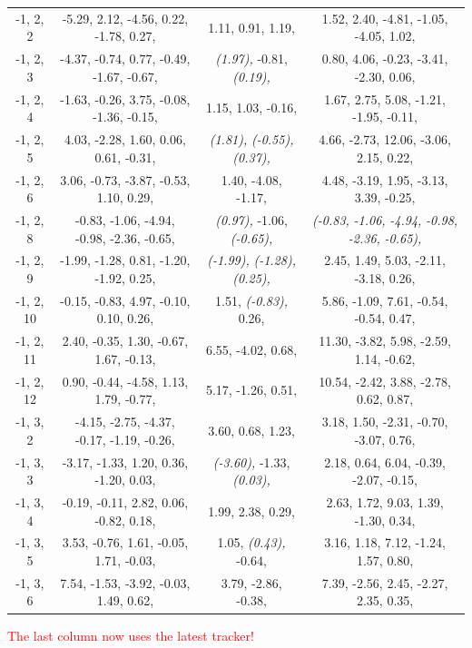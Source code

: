 \documentclass[compress]{beamer}
\begin{document}
\begin{frame}
{\begin{tabular}{c c c c}
-1, 2, 2 &  -5.29,   2.12,   -4.56,   0.22,   -1.78,   0.27,  &  1.11,   0.91,   1.19,  &  1.52,   2.40,   -4.81,   -1.05,   -4.05,   1.02,  \\
-1, 2, 3 &  -4.37,   -0.74,   0.77,   -0.49,   -1.67,   -0.67,  &  {\it (1.97),}   -0.81,   {\it (0.19),}  &  0.80,   4.06,   -0.23,   -3.41,   -2.30,   0.06,  \\
-1, 2, 4 &  -1.63,   -0.26,   3.75,   -0.08,   -1.36,   -0.15,  &  1.15,   1.03,   -0.16,  &  1.67,   2.75,   5.08,   -1.21,   -1.95,   -0.11,  \\
-1, 2, 5 &  4.03,   -2.28,   1.60,   0.06,   0.61,   -0.31,  &  {\it (1.81),}   {\it (-0.55),}   {\it (0.37),}  &  4.66,   -2.73,   12.06,   -3.06,   2.15,   0.22,  \\
-1, 2, 6 &  3.06,   -0.73,   -3.87,   -0.53,   1.10,   0.29,  &  1.40,   -4.08,   -1.17,  &  4.48,   -3.19,   1.95,   -3.13,   3.39,   -0.25,  \\
-1, 2, 8 &  -0.83,   -1.06,   -4.94,   -0.98,   -2.36,   -0.65,  &  {\it (0.97),}   -1.06,   {\it (-0.65),}  &  {\it (-0.83,}   {\it -1.06,}   {\it -4.94,}   {\it -0.98,}   {\it -2.36,}   {\it -0.65),}  \\
-1, 2, 9 &  -1.99,   -1.28,   0.81,   -1.20,   -1.92,   0.25,  &  {\it (-1.99),}   {\it (-1.28),}   {\it (0.25),}  &  2.45,   1.49,   5.03,   -2.11,   -3.18,   0.26,  \\
-1, 2, 10 &  -0.15,   -0.83,   4.97,   -0.10,   0.10,   0.26,  &  1.51,   {\it (-0.83),}   0.26,  &  5.86,   -1.09,   7.61,   -0.54,   -0.54,   0.47,  \\
-1, 2, 11 &  2.40,   -0.35,   1.30,   -0.67,   1.67,   -0.13,  &  6.55,   -4.02,   0.68,  &  11.30,   -3.82,   5.98,   -2.59,   1.14,   -0.62,  \\
-1, 2, 12 &  0.90,   -0.44,   -4.58,   1.13,   1.79,   -0.77,  &  5.17,   -1.26,   0.51,  &  10.54,   -2.42,   3.88,   -2.78,   0.62,   0.87,  \\
-1, 3, 2 &  -4.15,   -2.75,   -4.37,   -0.17,   -1.19,   -0.26,  &  3.60,   0.68,   1.23,  &  3.18,   1.50,   -2.31,   -0.70,   -3.07,   0.76,  \\
-1, 3, 3 &  -3.17,   -1.33,   1.20,   0.36,   -1.20,   0.03,  &  {\it (-3.60),}   -1.33,   {\it (0.03),}  &  2.18,   0.64,   6.04,   -0.39,   -2.07,   -0.15,  \\
-1, 3, 4 &  -0.19,   -0.11,   2.82,   0.06,   -0.82,   0.18,  &  1.99,   2.38,   0.29,  &  2.63,   1.72,   9.03,   1.39,   -1.30,   0.34,  \\
-1, 3, 5 &  3.53,   -0.76,   1.61,   -0.05,   1.71,   -0.03,  &  1.05,   {\it (0.43),}   -0.64,  &  3.16,   1.18,   7.12,   -1.24,   1.57,   0.80,  \\
-1, 3, 6 &  7.54,   -1.53,   -3.92,   -0.03,   1.49,   0.62,  &  3.79,   -2.86,   -0.38,  &  7.39,   -2.56,   2.45,   -2.27,   2.35,   0.35,  \\
\end{tabular}}

\vfill \tiny \textcolor{red}{The last column now uses the latest tracker!}
\end{frame}
\end{document}
